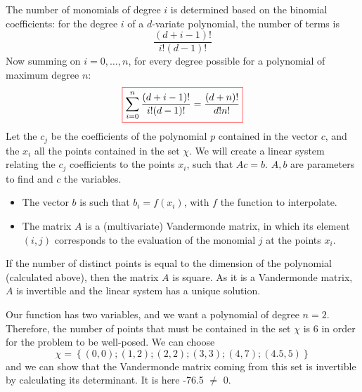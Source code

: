 \documentclass[11pt]{article}
\begin{document}
\begin{tcolorbox}[breakable,
                  colback=white,
                  colframe=white!75!black,
                  title={Compute explicitly the dimension of \(P^d_n\). Provide (with proof) a sufficient condition for the existence and the uniqueness of the d-variate polynomial interpolation of degree n at the set of points \(\chi\). Later, if this sufficient condition is satisfied, we will simply say that the interpolation problem is well-posed.}
                 ]
    The number of monomials of degree \(i\) is determined based on the binomial coefficients: for the degree \(i\) of a \(d\)-variate polynomial, the number of terms is \[\frac{(d+i-1)!}{i!(d-1)!}\] Now summing on \(i=0,\dots,n\), for every degree possible for a polynomial of maximum degree \(n\):
    \begin{equation}
        \color{red}\boxed{\color{black}\sum_{i=0}^n \frac{(d+i-1)!}{i!(d-1)!} = \frac{(d+n)!}{d!n!}}\color{black}
    \end{equation}
    Let the \(c_j\) be the coefficients of the polynomial \(p\) contained in the vector \(c\), and the \(x_i\) all the points contained in the set \(\chi\). We will create a linear system relating the \(c_j\) coefficients to the points \(x_i\), such that \(Ac=b\). \(A,b\) are parameters to find and \(c\) the variables. 
    \begin{itemize}
        \item The vector \(b\) is such that \(b_i = f(x_i)\), with \(f\) the function to interpolate.
        \item The matrix \(A\) is a (multivariate) Vandermonde matrix, in which its element \((i,j)\) corresponds to the evaluation of the monomial \(j\) at the points \(x_i\).
    \end{itemize}
    If the number of distinct points is equal to the dimension of the polynomial (calculated above), then the matrix \(A\) is square. As it is a Vandermonde matrix, \(A\) is invertible and the linear system has a unique solution.
\end{tcolorbox}
\begin{tcolorbox}[breakable,
                  colback=white,
                  colframe=white!75!black,
                  title={Give an example of a set \(\chi^2\subset \mathbb{R}^2\) such that the polynomial interpolation with \(n = 2\) is well-posed and rigorously justify it.}
                 ]
    Our function has two variables, and we want a polynomial of degree \(n=2\). Therefore, the number of points that must be contained in the set \(\chi\) is 6 in order for the problem to be well-posed. We can choose 
    \begin{equation}
        \chi = \left\{(0,0); (1,2);(2,2);(3,3);(4,7); (4.5,5)\right\}
    \end{equation}
    and we can show that the Vandermonde matrix coming from this set is invertible by calculating its determinant. It is here -76.5 $\neq$ 0.
\end{tcolorbox}
\end{document}
